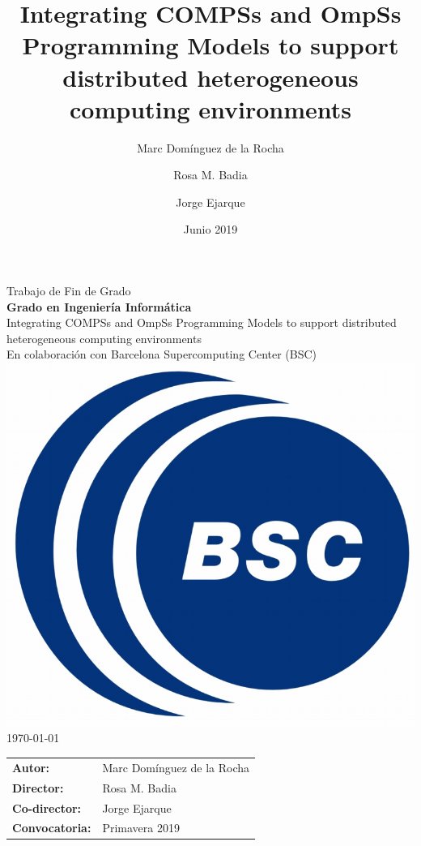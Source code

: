\documentclass[a4paper]{article}
\title{Integrating COMPSs and OmpSs Programming Models to support distributed heterogeneous computing environments}
\author
{
Marc Domínguez de la Rocha
\and
Rosa M. Badia
\and
Jorge Ejarque
}
\date{Junio 2019}
\begin{document}
  {\centering
    {\Huge Trabajo de Fin de Grado}\\
    \vspace{5mm}
    {\Large \textbf{Grado en Ingeniería Informática}}\\
    \vspace{15mm}
    \LARGE {Integrating COMPSs and OmpSs Programming Models to
	support distributed heterogeneous computing environments}\\
    \vspace{15mm}
    \Large {En colaboración con Barcelona Supercomputing Center (BSC)}\\
    \vspace{5mm}
    \includegraphics[scale=0.3]{images/portada/BSC-Logo.png}\\
    \vspace{5mm}
    \Large \today \\
    }
    \vspace{17mm}
    \hspace{2mm}
    \begin{tabular}{l@{ } l}
        \vspace{5mm}
        \Large \textbf{Autor:} & \Large{Marc Domínguez de la Rocha} \\
        \vspace{5mm}
        \Large\textbf{Director:} & \Large{Rosa M. Badia}\\
        \vspace{5mm}
        \Large\textbf{Co-director:} & \Large{Jorge Ejarque}\\
        \vspace{5mm}
         \Large\textbf{Convocatoria: } & \Large{Primavera 2019}\\
    \end{tabular}\par
\end{document}
